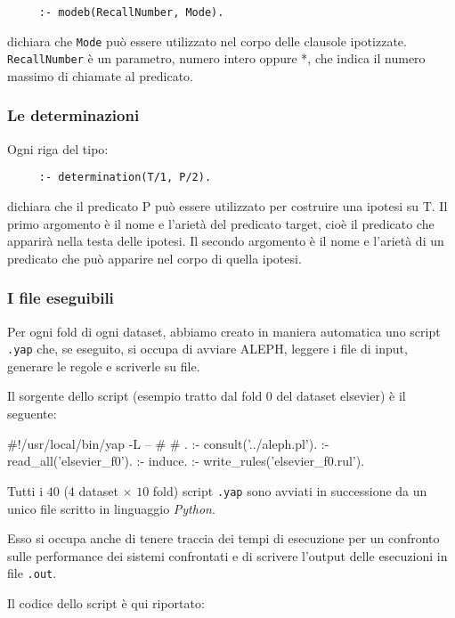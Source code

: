 \begin{verbatim}
     :- modeb(RecallNumber, Mode).
\end{verbatim}
dichiara che \verb+Mode+ può essere utilizzato nel corpo delle clausole ipotizzate. \verb+RecallNumber+ è un parametro, numero intero oppure *, che indica il numero massimo di chiamate al predicato.

\subsubsection*{Le determinazioni}
Ogni riga del tipo:
\begin{verbatim}
     :- determination(T/1, P/2).
\end{verbatim}
dichiara che il predicato P può essere utilizzato per costruire una ipotesi su T.
Il primo argomento è il nome e l'arietà del predicato target, cioè il predicato che apparirà nella testa delle ipotesi. Il secondo argomento è il nome e l'arietà di un predicato che può apparire nel corpo di quella ipotesi.

\subsubsection{I file eseguibili}
Per ogni fold di ogni dataset, abbiamo creato in maniera automatica uno script \verb+.yap+ che, se eseguito, si occupa di avviare ALEPH, leggere i file di input, generare le regole e scriverle su file.

Il sorgente dello script (esempio tratto dal fold 0 del dataset elsevier) è il seguente:

\begin{prologcode}
#!/usr/local/bin/yap -L --
#
# .
:- consult('../aleph.pl').
:- read_all('elsevier_f0').
:- induce.
:- write_rules('elsevier_f0.rul').
\end{prologcode}

Tutti i $40$ ($4$ dataset $\times$ $10$ fold) script \verb+.yap+ sono avviati in successione da un unico file scritto in linguaggio \emph{Python}.

Esso si occupa anche di tenere traccia dei tempi di esecuzione per un confronto sulle performance dei sistemi confrontati e di scrivere l'output delle esecuzioni in file \verb+.out+.

Il codice dello script è qui riportato:

